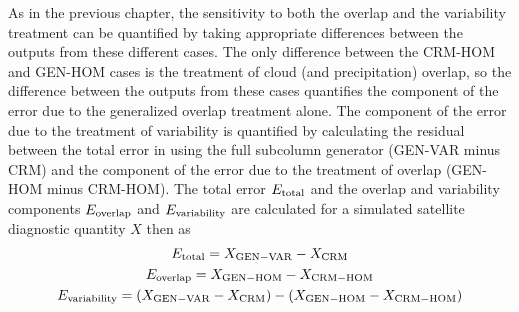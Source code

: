 As in the previous chapter, the sensitivity to both the overlap and the variability treatment can be quantified by taking appropriate differences between the outputs from these different cases. The only difference between the CRM-HOM and GEN-HOM cases is the treatment of cloud (and precipitation) overlap, so the difference between the outputs from these cases quantifies the component of the error due to the generalized overlap treatment alone. The component of the error due to the treatment of variability is quantified by calculating the residual between the total error in using the full subcolumn generator (GEN-VAR minus CRM) and the component of the error due to the treatment of overlap (GEN-HOM minus CRM-HOM). The total error $E_{\rm total}$ and the overlap and variability components $E_{\rm overlap}$ and $E_{\rm variability}$ are calculated for a simulated satellite diagnostic quantity $X$ then as
\begin{gather}
E_{\rm total} = X_{\rm GEN-VAR} - X_{\rm CRM} \\
E_{\rm overlap} = X_{\rm GEN-HOM} - X_{\rm CRM-HOM} \\
E_{\rm variability} = (X_{\rm GEN-VAR} - X_{\rm CRM}) - (X_{\rm GEN-HOM} - X_{\rm CRM-HOM})
\end{gather}


